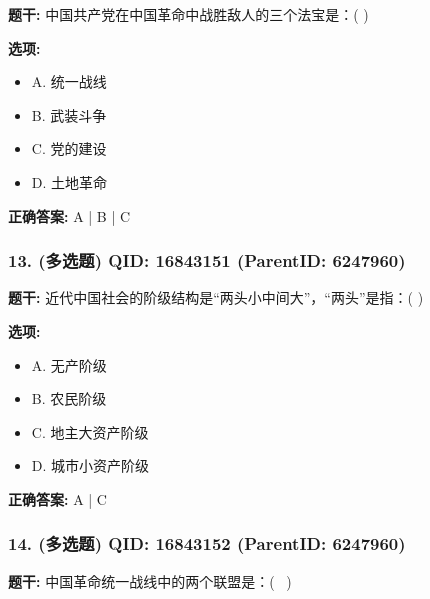 \documentclass[12pt,UTF8]{ctexart}
\begin{document}
\textbf{题干:}
中国共产党在中国革命中战胜敌人的三个法宝是：( )



\textbf{选项:}
\begin{itemize}[leftmargin=*]

  \item A. 统一战线

  \item B. 武装斗争

  \item C. 党的建设

  \item D. 土地革命

\end{itemize}

\textbf{正确答案:}
A | B | C

\vspace{0.3em}\hrulefill\vspace{0.7em}

\subsubsection*{13. (多选题) \small QID: 16843151 (ParentID: 6247960)}

\textbf{题干:}
近代中国社会的阶级结构是“两头小中间大”，“两头”是指：( )



\textbf{选项:}
\begin{itemize}[leftmargin=*]

  \item A. 无产阶级

  \item B. 农民阶级

  \item C. 地主大资产阶级

  \item D. 城市小资产阶级

\end{itemize}

\textbf{正确答案:}
A | C

\vspace{0.3em}\hrulefill\vspace{0.7em}

\subsubsection*{14. (多选题) \small QID: 16843152 (ParentID: 6247960)}

\textbf{题干:}
中国革命统一战线中的两个联盟是：(  )
\end{document}
